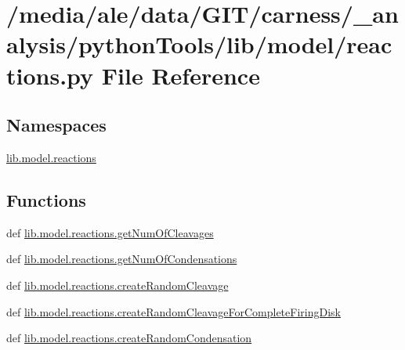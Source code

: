 \hypertarget{a00059}{\section{/media/ale/data/\-G\-I\-T/carness/\-\_\-analysis/python\-Tools/lib/model/reactions.py File Reference}
\label{a00059}
}
\subsection*{Namespaces}
\begin{DoxyCompactItemize}
\item 
\hyperlink{a00118}{lib.\-model.\-reactions}
\end{DoxyCompactItemize}
\subsection*{Functions}
\begin{DoxyCompactItemize}
\item 
def \hyperlink{a00118_a39866224c062e8fdc5905a4202d9e579}{lib.\-model.\-reactions.\-get\-Num\-Of\-Cleavages}
\item 
def \hyperlink{a00118_a8385f261f5039a8cfeefa089298872f3}{lib.\-model.\-reactions.\-get\-Num\-Of\-Condensations}
\item 
def \hyperlink{a00118_a2e361527fbcbb7ae4b02783df35d33ff}{lib.\-model.\-reactions.\-create\-Random\-Cleavage}
\item 
def \hyperlink{a00118_a5eb802389e0de8e036b9a38dfeb41c70}{lib.\-model.\-reactions.\-create\-Random\-Cleavage\-For\-Complete\-Firing\-Disk}
\item 
def \hyperlink{a00118_abc3efdd6ab0936972017dc010317bd3d}{lib.\-model.\-reactions.\-create\-Random\-Condensation}
\end{DoxyCompactItemize}
